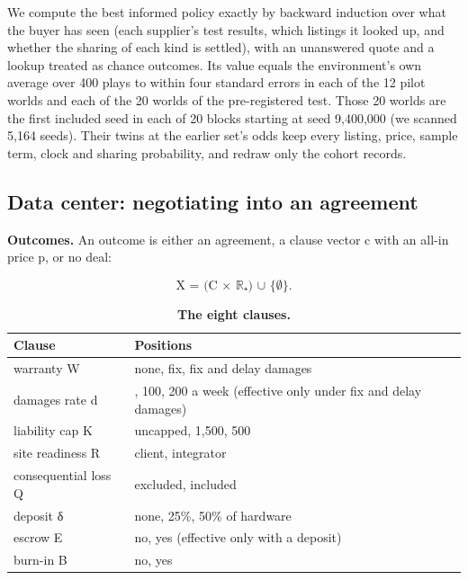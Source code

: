 We compute the best informed policy exactly by backward induction over what the buyer has seen (each supplier's test
results, which listings it looked up, and whether the sharing of each kind is settled), with an unanswered quote and
a lookup treated as chance outcomes. Its value equals the environment's own average over 400 plays to within four
standard errors in each of the 12 pilot worlds and each of the 20 worlds of the pre-registered test. Those 20
worlds are the first included seed in each of 20 blocks starting at seed 9,400,000 (we scanned 5,164 seeds). Their
twins at the earlier set's odds keep every listing, price, sample term, clock and sharing probability, and redraw
only the cohort records.

\subsection{Data center: negotiating into an agreement}\label{data-center-negotiating-into-an-agreement}

\textbf{Outcomes.} An outcome is either an agreement, a clause vector c with an all-in price p, or no deal:

\[ \text{X = (C × ℝ₊) ∪ \{∅\}.} \tag{A.7} \]

\renewcommand{\thetable}{A.4}
\begin{longtable}[]{@{}
  >{\raggedright\arraybackslash}p{}
  >{\raggedright\arraybackslash}p{}@{}}
\caption{\textbf{The eight clauses.}}\label{tab:A.4}\tabularnewline
\toprule\noalign{}
\begin{minipage}[b]{\linewidth}\raggedright
Clause
\end{minipage} & \begin{minipage}[b]{\linewidth}\raggedright
Positions
\end{minipage} \\
\midrule\noalign{}
\endhead
\bottomrule\noalign{}
\endlastfoot
warranty W & none, fix, fix and delay damages \\
damages rate d & 50, 100, 200 a week (effective only under fix and delay damages) \\
liability cap K & uncapped, 1,500, 500 \\
site readiness R & client, integrator \\
consequential loss Q & excluded, included \\
deposit δ & none, 25\%, 50\% of hardware \\
escrow E & no, yes (effective only with a deposit) \\
burn-in B & no, yes \\
\end{longtable}

